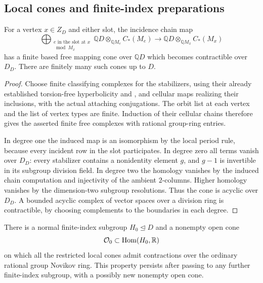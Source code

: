 \subsection{Local cones and finite-index preparations}

\begin{lemma}\label{kernel:local-cones}
For a vertex \(x\in Z_D\) and either slot, the incidence chain map
\[
 \bigoplus_{\substack{e\text{ in the slot at }x\\ \bmod M_x}}
       \mathbb QD\otimes_{\mathbb QM_e}C_*(M_e)
       \longrightarrow
       \mathbb QD\otimes_{\mathbb QM_x}C_*(M_x)
\]
has a finite based free mapping cone over \(\mathbb QD\) which becomes
contractible over \(D_D\).  There are finitely many such cones up to
\(D\).
\end{lemma}

\begin{proof}
Choose finite classifying complexes for the stabilizers, using their
already established torsion-free hyperbolicity and
\cite[Theorem~5]{MeintrupSchick2002}, and cellular
maps realizing their inclusions, with the actual attaching conjugations.
The orbit list at each vertex and the list of vertex types are finite.
Induction of their cellular chains therefore gives the asserted finite
free complexes with rational group-ring entries.

In degree one the induced map is an isomorphism by the local period
rule, because every incident row in the slot participates.  In degree
zero all terms vanish over \(D_D\): every stabilizer contains a
nonidentity element \(g\), and \(g-1\) is invertible in its subgroup
division field.  In degree two the homology vanishes by the induced
chain computation and injectivity of the ambient \(2\)-columns.
Higher homology vanishes by the dimension-two subgroup resolutions.
Thus the cone is acyclic over \(D_D\).  A bounded acyclic complex of
vector spaces over a division ring is contractible, by choosing
complements to the boundaries in each degree.
\end{proof}

\begin{lemma}\label{kernel:novikov-open}
There is a normal finite-index subgroup \(H_0\unlhd D\) and a nonempty
open cone
\[
                    \mathcal O_0\subset\operatorname{Hom}(H_0,\mathbb R)
\]
on which all the restricted local cones admit contractions over the
ordinary rational group Novikov ring.  This property persists after
passing to any further finite-index subgroup, with a possibly new
nonempty open cone.
\end{lemma}

